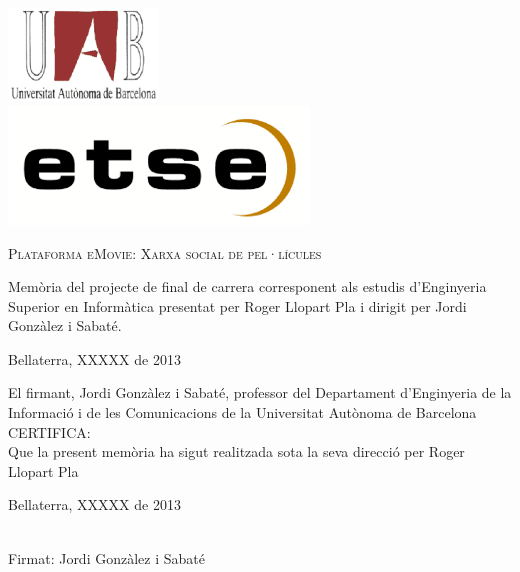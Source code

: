 \documentclass[a4paper,12pt,catalan]{book}
\begin{document}

\pagestyle{plain}
\thispagestyle{empty}


\vspace{0.39cm}
\begin{center}
\includegraphics[width=4cm]{figs/uab}\\
\includegraphics[width=8cm]{figs/etse}
\end{center}
\vspace{0.39cm}

\vfill{}

{\par\centering \textsc{\Large Plataforma eMovie: Xarxa social de pel·lícules}\par}
\vfill{}

\begin{center}

\begin{minipage}[t]{0.65\columnwidth}
Memòria del projecte de final de carrera corresponent als estudis 
d'Enginyeria Superior en Informàtica presentat per Roger Llopart Pla
i dirigit per Jordi Gonzàlez i Sabaté.

\end{minipage}
\medskip


\end{center}

\vfill{}
{\par\centering Bellaterra, XXXXX de 2013 \par}


\newpage \vspace*{6 true cm} \begin{center} \begin{minipage}{4in}
\parindent=0pt El firmant, Jordi Gonzàlez i Sabaté, professor del Departament d'Enginyeria de la Informació i de les Comunicacions de la Universitat Autònoma de Barcelona \\

CERTIFICA:\\

Que la present memòria ha sigut realitzada sota la seva direcció per
Roger Llopart Pla \par \vspace*{.5in} Bellaterra, XXXXX de 2013
\vspace*{.5in}
\begin{center} \vrule width 3in height 0.4pt\\Firmat: Jordi Gonzàlez i Sabaté
\end{center} \end{minipage} \end{center}
\end{document}
